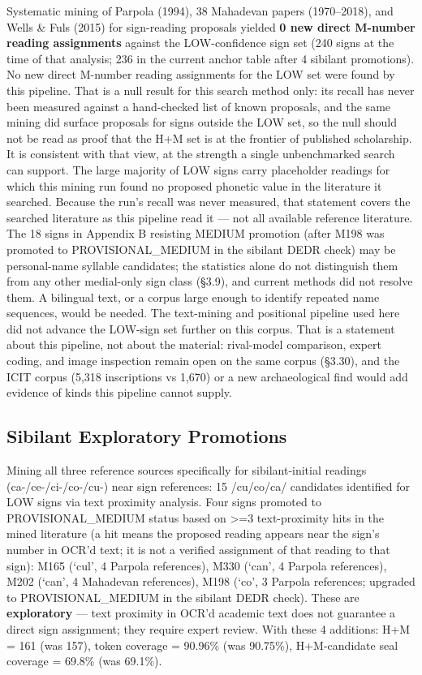 \documentclass[11pt]{article}
\begin{document}
Systematic mining of Parpola (1994), 38 Mahadevan papers (1970--2018),
and Wells \& Fuls (2015) for sign-reading proposals yielded \textbf{0 new direct
M-number reading assignments} against the LOW-confidence sign set (240 signs at the time of that analysis; 236 in the current anchor table after 4 sibilant promotions). No new direct M-number reading assignments for the LOW set were found by this pipeline. That is a null result for this search method only: its recall has never been measured against a hand-checked list of known proposals, and the same mining did surface proposals for signs outside the LOW set, so the null should not be read as proof that the H+M set is at the frontier of published scholarship. It is consistent with that view, at the strength a single unbenchmarked search can support. The large majority of LOW signs carry placeholder readings for which this mining run found no proposed phonetic value in the literature it searched. Because the run's recall was never measured, that statement covers the searched literature as this pipeline read it --- not all available reference literature. The 18 signs in Appendix B resisting MEDIUM promotion (after M198 was promoted to PROVISIONAL\_MEDIUM in the sibilant DEDR check) may be personal-name syllable candidates; the statistics alone do not distinguish them from any other medial-only sign class (§3.9), and current methods did not resolve them. A bilingual text, or a corpus large enough to identify repeated name sequences, would be needed.
The text-mining and positional pipeline used here did not advance the LOW-sign set further on this corpus. That is a statement about this pipeline, not about the material: rival-model comparison, expert coding, and image inspection remain open on the same corpus (§3.30), and the ICIT corpus (5,318 inscriptions vs 1,670) or a new archaeological find would add evidence of kinds this pipeline cannot supply.

\subsection{Sibilant Exploratory Promotions
}\label{sibilant-exploratory-promotions-phase-163}

Mining all three reference sources specifically for sibilant-initial
readings (ca-/ce-/ci-/co-/cu-) near sign references: 15 /cu/co/ca/
candidates identified for LOW signs via text proximity analysis. Four signs promoted to PROVISIONAL\_MEDIUM status based on \textgreater{}=3 text-proximity hits in the mined literature (a hit means the proposed reading appears near the sign's number in OCR'd text; it is not a verified assignment of that reading to that sign): M165 (`cul', 4 Parpola references), M330 (`can', 4 Parpola
references), M202 (`can', 4 Mahadevan references), M198 (`co', 3 Parpola references;
upgraded to PROVISIONAL\_MEDIUM in the sibilant DEDR check). These are \textbf{exploratory} --- text proximity
in OCR'd academic text does not guarantee a direct sign assignment; they
require expert review. With these 4 additions: H+M = 161 (was 157),
token coverage = 90.96\% (was 90.75\%), H+M-candidate seal coverage = 69.8\% (was 69.1\%).
\end{document}
